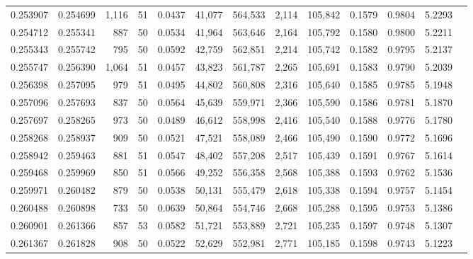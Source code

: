 \begin{tabular}{rrrrrrrrrrrrr}
0.253907 & 0.254699 & 1,116 &  51 &                                     0.0437 &  41,077 & 564,533 &   2,114 & 105,842 & 0.1579 & 0.9804 & 5.2293 \\
0.254712 & 0.255341 &   887 &  50 &                                     0.0534 &  41,964 & 563,646 &   2,164 & 105,792 & 0.1580 & 0.9800 & 5.2211 \\
0.255343 & 0.255742 &   795 &  50 &                                     0.0592 &  42,759 & 562,851 &   2,214 & 105,742 & 0.1582 & 0.9795 & 5.2137 \\
0.255747 & 0.256390 & 1,064 &  51 &                                     0.0457 &  43,823 & 561,787 &   2,265 & 105,691 & 0.1583 & 0.9790 & 5.2039 \\
0.256398 & 0.257095 &   979 &  51 &                                     0.0495 &  44,802 & 560,808 &   2,316 & 105,640 & 0.1585 & 0.9785 & 5.1948 \\
0.257096 & 0.257693 &   837 &  50 &                                     0.0564 &  45,639 & 559,971 &   2,366 & 105,590 & 0.1586 & 0.9781 & 5.1870 \\
0.257697 & 0.258265 &   973 &  50 &                                     0.0489 &  46,612 & 558,998 &   2,416 & 105,540 & 0.1588 & 0.9776 & 5.1780 \\
0.258268 & 0.258937 &   909 &  50 &                                     0.0521 &  47,521 & 558,089 &   2,466 & 105,490 & 0.1590 & 0.9772 & 5.1696 \\
0.258942 & 0.259463 &   881 &  51 &                                     0.0547 &  48,402 & 557,208 &   2,517 & 105,439 & 0.1591 & 0.9767 & 5.1614 \\
0.259468 & 0.259969 &   850 &  51 &                                     0.0566 &  49,252 & 556,358 &   2,568 & 105,388 & 0.1593 & 0.9762 & 5.1536 \\
0.259971 & 0.260482 &   879 &  50 &                                     0.0538 &  50,131 & 555,479 &   2,618 & 105,338 & 0.1594 & 0.9757 & 5.1454 \\
0.260488 & 0.260898 &   733 &  50 &                                     0.0639 &  50,864 & 554,746 &   2,668 & 105,288 & 0.1595 & 0.9753 & 5.1386 \\
0.260901 & 0.261366 &   857 &  53 &                                     0.0582 &  51,721 & 553,889 &   2,721 & 105,235 & 0.1597 & 0.9748 & 5.1307 \\
0.261367 & 0.261828 &   908 &  50 &                                     0.0522 &  52,629 & 552,981 &   2,771 & 105,185 & 0.1598 & 0.9743 & 5.1223 \\

\end{tabular}
